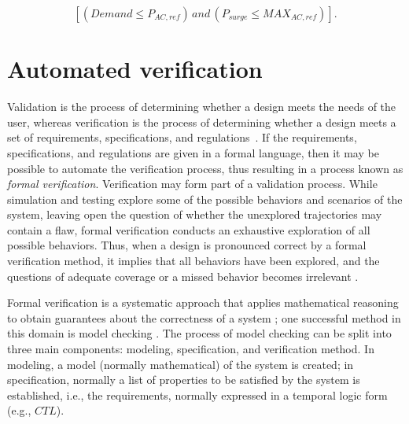 \documentclass[journal]{IEEEtran}
\begin{document}
\begin{equation}
\label{eq:invcheck} 
\left[ (Demand \leq P_{AC,ref}) \, and \, (P_{surge} \leq MAX_{AC,ref}) \right].
\end{equation}

\section{Automated verification}
\label{sec:AutomatedVerification}
Validation is the process of determining whether a design meets the needs of the user, whereas verification is the process of determining whether a design meets a set of requirements, specifications, and regulations~\cite{ClarkeHV18}. If the requirements, specifications, and regulations are given in a formal language, then it may be possible to automate the verification process, thus resulting in a process known as \textit{formal verification}. Verification may form part of a validation process.
While simulation and testing explore some of the possible behaviors and scenarios of the system, leaving open the question of whether the unexplored trajectories may contain a flaw, formal verification conducts an exhaustive exploration of all possible behaviors. Thus, when a design is pronounced correct by a formal verification method, it implies that all behaviors have been explored, and the questions of adequate coverage or a missed behavior becomes irrelevant \cite{Clarke2012}.

Formal verification is a systematic approach that applies mathematical reasoning to obtain guarantees about the correctness of a system \cite{Forejt2011}; one successful method in this domain is model checking \cite{Clarke2012}.
%
The process of model checking can be split into three main components: modeling, specification, and verification method. In modeling, a model (normally mathematical) of the system is created; in specification, normally a list of properties to be satisfied by the system is established, i.e., the requirements, normally  expressed in a temporal logic form (e.g., $CTL$).
\end{document}
